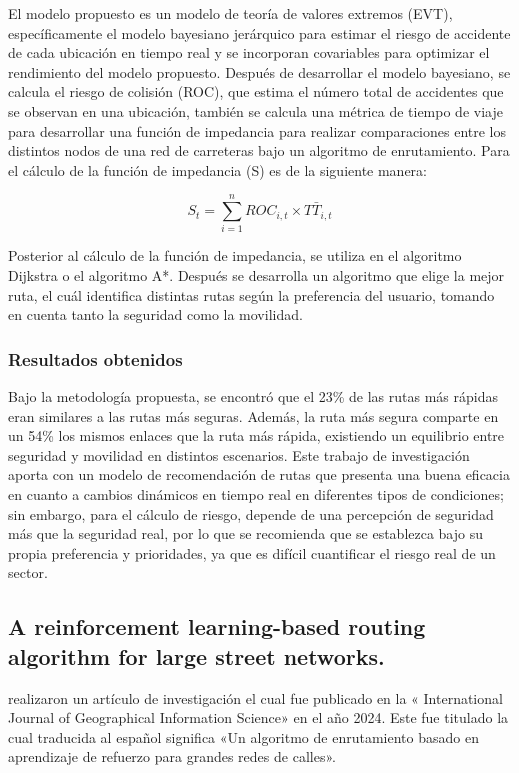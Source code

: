 El modelo propuesto es un modelo de teoría de valores extremos (EVT), específicamente el modelo bayesiano jerárquico para estimar el riesgo de accidente de cada ubicación en tiempo real y se incorporan covariables para optimizar el rendimiento del modelo propuesto. Después de desarrollar el modelo bayesiano, se calcula el riesgo de colisión (ROC), que estima el número total de accidentes que se observan en una ubicación, también se calcula una métrica de tiempo de viaje para desarrollar una función de impedancia para realizar comparaciones entre los distintos nodos de una red de carreteras bajo un algoritmo de enrutamiento. Para el cálculo de la función de impedancia (S) es de la siguiente manera:


\begin{equation} 
	S_{t} = \sum_{i=1}^{n}ROC_{i,t}\times T\bar{T}_{i,t}
\end{equation}


Posterior al cálculo de la función de impedancia, se utiliza en el algoritmo Dijkstra o el algoritmo A*. Después se desarrolla un algoritmo que elige la mejor ruta, el cuál identifica distintas rutas según la preferencia del usuario, tomando en cuenta tanto la seguridad como la movilidad.

\subsubsection{Resultados obtenidos}
Bajo la metodología propuesta, se encontró que el 23\% de las rutas más rápidas eran similares a las rutas más seguras. Además, la ruta más segura comparte en un 54\% los mismos enlaces que la ruta más rápida, existiendo un equilibrio entre seguridad y movilidad en distintos escenarios. Este trabajo de investigación aporta con un modelo de recomendación de rutas que presenta una buena eficacia en cuanto a cambios dinámicos en tiempo real en diferentes tipos de condiciones; sin embargo, para el cálculo de riesgo, depende de una percepción de seguridad más que la seguridad real, por lo que se recomienda que se establezca bajo su propia preferencia y prioridades, ya que es difícil cuantificar el riesgo real de un sector.

\subsection{A reinforcement learning-based routing algorithm for large street networks. \citep*{pr_de}}
\citeauthor{pr_de} realizaron un artículo de investigación el cual fue publicado en la « International Journal of Geographical Information Science» en el año 2024. Este fue titulado  la cual traducida al español significa «Un algoritmo de enrutamiento basado en aprendizaje de refuerzo para grandes redes de calles».

